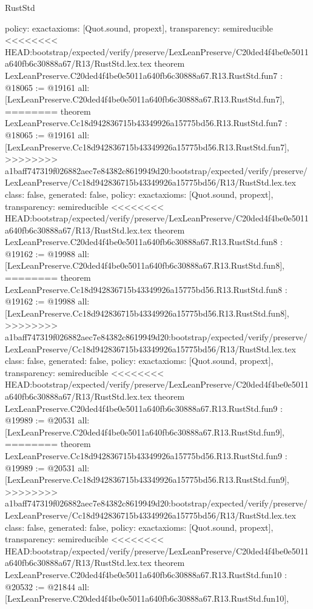 \begin{lexlean}{RustStd}
\begin{coremodule}
{\begin{coremodule}
{{{{{{{{{{  policy: exact{axioms: [Quot.sound, propext]},
  transparency: semireducible
}
<<<<<<<< HEAD:bootstrap/expected/verify/preserve/LexLeanPreserve/C20ded4f4be0e5011a640fb6c30888a67/R13/RustStd.lex.tex
theorem LexLeanPreserve.C20ded4f4be0e5011a640fb6c30888a67.R13.RustStd.fun7 : @18065 := @19161 {
  all: [LexLeanPreserve.C20ded4f4be0e5011a640fb6c30888a67.R13.RustStd.fun7],
========
theorem LexLeanPreserve.Cc18d942836715b43349926a15775bd56.R13.RustStd.fun7 : @18065 := @19161 {
  all: [LexLeanPreserve.Cc18d942836715b43349926a15775bd56.R13.RustStd.fun7],
>>>>>>>> a1baff747319f026882aec7e84382c8619949d20:bootstrap/expected/verify/preserve/LexLeanPreserve/Cc18d942836715b43349926a15775bd56/R13/RustStd.lex.tex
  class: false,
  generated: false,
  policy: exact{axioms: [Quot.sound, propext]},
  transparency: semireducible
}
<<<<<<<< HEAD:bootstrap/expected/verify/preserve/LexLeanPreserve/C20ded4f4be0e5011a640fb6c30888a67/R13/RustStd.lex.tex
theorem LexLeanPreserve.C20ded4f4be0e5011a640fb6c30888a67.R13.RustStd.fun8 : @19162 := @19988 {
  all: [LexLeanPreserve.C20ded4f4be0e5011a640fb6c30888a67.R13.RustStd.fun8],
========
theorem LexLeanPreserve.Cc18d942836715b43349926a15775bd56.R13.RustStd.fun8 : @19162 := @19988 {
  all: [LexLeanPreserve.Cc18d942836715b43349926a15775bd56.R13.RustStd.fun8],
>>>>>>>> a1baff747319f026882aec7e84382c8619949d20:bootstrap/expected/verify/preserve/LexLeanPreserve/Cc18d942836715b43349926a15775bd56/R13/RustStd.lex.tex
  class: false,
  generated: false,
  policy: exact{axioms: [Quot.sound, propext]},
  transparency: semireducible
}
<<<<<<<< HEAD:bootstrap/expected/verify/preserve/LexLeanPreserve/C20ded4f4be0e5011a640fb6c30888a67/R13/RustStd.lex.tex
theorem LexLeanPreserve.C20ded4f4be0e5011a640fb6c30888a67.R13.RustStd.fun9 : @19989 := @20531 {
  all: [LexLeanPreserve.C20ded4f4be0e5011a640fb6c30888a67.R13.RustStd.fun9],
========
theorem LexLeanPreserve.Cc18d942836715b43349926a15775bd56.R13.RustStd.fun9 : @19989 := @20531 {
  all: [LexLeanPreserve.Cc18d942836715b43349926a15775bd56.R13.RustStd.fun9],
>>>>>>>> a1baff747319f026882aec7e84382c8619949d20:bootstrap/expected/verify/preserve/LexLeanPreserve/Cc18d942836715b43349926a15775bd56/R13/RustStd.lex.tex
  class: false,
  generated: false,
  policy: exact{axioms: [Quot.sound, propext]},
  transparency: semireducible
}
<<<<<<<< HEAD:bootstrap/expected/verify/preserve/LexLeanPreserve/C20ded4f4be0e5011a640fb6c30888a67/R13/RustStd.lex.tex
theorem LexLeanPreserve.C20ded4f4be0e5011a640fb6c30888a67.R13.RustStd.fun10 : @20532 := @21844 {
  all: [LexLeanPreserve.C20ded4f4be0e5011a640fb6c30888a67.R13.RustStd.fun10],
}}}}}}}}}}}}}
\end{coremodule}}
\end{coremodule}
\end{lexlean}

